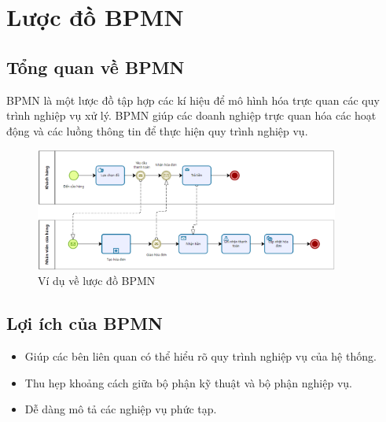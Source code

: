 \section{Lược đồ BPMN}
\subsection{Tổng quan về BPMN}
\hspace*{0.5cm}BPMN là một lược đồ tập hợp các kí hiệu để mô hình hóa trực quan các quy trình nghiệp vụ xử lý. BPMN giúp các doanh nghiệp trực quan hóa các hoạt động và các luồng thông tin để thực hiện quy trình nghiệp vụ.
\begin{figure}[!htp]
    \centering
    \includegraphics[width=10cm]{img/theory/BPMN/BPMN_sample.png}
    \newline
    \caption{Ví dụ về lược đồ BPMN}
\end{figure}



\subsection{Lợi ích của BPMN}
\begin{itemize}
    \item Giúp các bên liên quan có thể hiểu rõ quy trình nghiệp vụ của hệ thống.
    \item Thu hẹp khoảng cách giữa bộ phận kỹ thuật và bộ phận nghiệp vụ.
    \item Dễ dàng mô tả các nghiệp vụ phức tạp.
\end{itemize}

